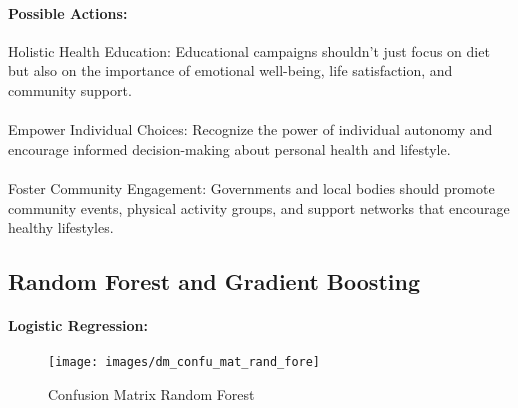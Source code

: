 		\paragraph{Possible Actions:}
			Holistic Health Education: Educational campaigns shouldn't just focus on diet but also on the importance
			of emotional well-being, life satisfaction, and community support.
			\\
			\\
			Empower Individual Choices: Recognize the power of individual autonomy and encourage informed
			decision-making about personal health and lifestyle.
			\\
			\\
			Foster Community Engagement: Governments and local bodies should promote community events, physical
			activity groups, and support networks that encourage healthy lifestyles.

\subsection{Random Forest and Gradient Boosting}

	\paragraph{Logistic Regression:}
		\begin{figure}[h!]
			\centering
			\texttt{[image: images/dm\_confu\_mat\_rand\_fore]}
			\caption{Confusion Matrix Random Forest}
			\label{fig:rand_fore}
		\end{figure}

